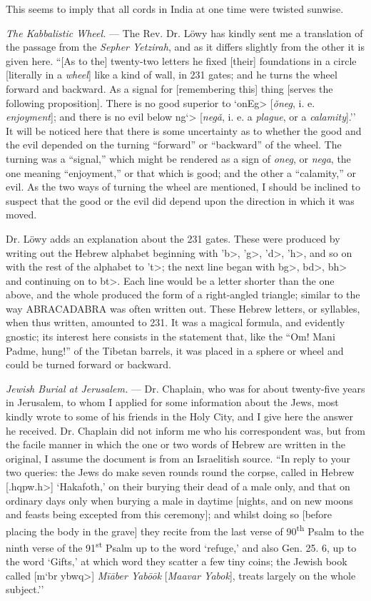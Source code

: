 \documentclass[a4paper, 11pt, oneside, polutonikogreek, english]{article}
\begin{document}
This seems to imply that all cords in India at one time were twisted sunwise.

\emph{The Kabbalistic Wheel.} --- The Rev. Dr. Löwy has kindly sent me a translation of the passage from the \emph{Sepher Yetzirah}, and as it differs slightly from the other it is given here. ``[As to the] twenty-two letters he fixed [their] foundations in a circle [literally in a \emph{wheel}] like a kind of wall, in 231 gates; and he turns the wheel forward and backward. As a signal for [remembering this] thing [serves the following proposition]. There is no good superior to \<`onEg> [\emph{ǒneg}, i. e. \emph{enjoyment}]; and there is no evil below \<ng`> [\emph{negǎ}, i. e. a \emph{plague}, or a \emph{calamity}].'' It will be noticed here that there is some uncertainty as to whether the good and the evil depended on the turning ``forward'' or ``backward'' of the wheel. The turning was a ``signal,'' which might be rendered as a sign of \emph{oneg}, or \emph{nega}, the one meaning ``enjoyment,'' or that which is good; and the other a ``calamity,'' or evil. As the two ways of turning the wheel are mentioned, I should be inclined to suspect that the good or the evil did depend upon the direction in which it was moved.

Dr. Löwy adds an explanation about the 231 gates. These were produced by writing out the Hebrew alphabet beginning with \<'b>, \<'g>, \<'d>, \<'h>, and so on with the rest of the alphabet to \<'t>; the next line began with \<bg>, \<bd>, \<bh> and continuing on to \<bt>. Each line would be a letter shorter than the one above, and the whole produced the form of a right-angled triangle; similar to the way ABRACADABRA was often written out. These Hebrew letters, or syllables, when thus written, amounted to 231. It was a magical formula, and evidently gnostic; its interest here consists in the statement that, like the ``Om! Mani Padme, hung!'' of the Tibetan barrels, it was placed in a sphere or wheel and could be turned forward or backward.

\emph{Jewish Burial at Jerusalem.} --- Dr. Chaplain, who was for about twenty-five years in Jerusalem, to whom I applied for some information about the Jews, most kindly wrote to some of his friends in the Holy City, and I give here the answer he received. Dr. Chaplain did not inform me who his correspondent was, but from the facile manner in which the one or two words of Hebrew are written in the original, I assume the document is from an Israelitish source. ``In reply to your two queries: the Jews do make seven rounds round the corpse, called in Hebrew [\<.hqpw.h>] `Hakafoth,' on their burying their dead of a male only, and that on ordinary days only when burying a male in daytime [nights, and on new moons and feasts being excepted from this ceremony]; and whilst doing so [before placing the body in the grave] they recite from the last verse of 90\textsuperscript{th} Psalm to the ninth verse of the 91\textsuperscript{st} Psalm up to the word `refuge,' and also Gen. 25. 6, up to the word `Gifts,' at which word they scatter a few tiny coins; the Jewish book called [\<m`br ybwq>] \emph{Mīāber Yabōōk} [\emph{Maavar Yabok}], treats largely on the whole subject.''
\end{document}
